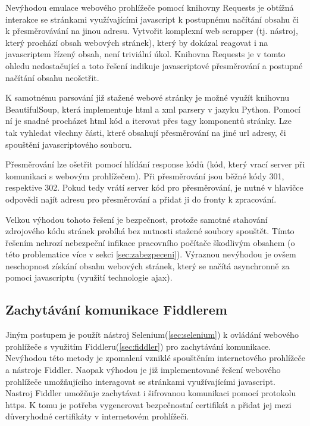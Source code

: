 \documentclass[thesis=M,czech,hidelinks]{FITthesis}[2013/05/06]
\begin{document}
Nevýhodou emulace webového prohlížeče pomocí knihovny Requests je obtížná interakce se stránkami využívajícími javascript k postupnému načítání obsahu či k přesměrovávání na jinou adresu. Vytvořit komplexní web scrapper (tj. nástroj, který prochází obsah webových stránek), který by dokázal reagovat i na javascriptem řízený obsah, není triviální úkol.  Knihovna Requests je v tomto ohledu nedostačující a toto řešení indikuje javascriptové přesměrování a postupné načítání obsahu neošetřit.

K samotnému parsování již stažené webové stránky je možné využít knihovnu BeautifulSoup\cite{beautifulsoup}, která implementuje html a xml parsery v jazyku Python. Pomocí ní je snadné procházet html kód a iterovat přes tagy komponentů stránky. Lze tak vyhledat všechny části, které obsahují přesměrování na jiné url adresy, či spouštění javascriptového souboru. 

Přesměrování lze ošetřit pomocí hlídání response kódů (kód, který vrací server při komunikaci s webovým prohlížečem). Při přesměrování jsou běžné kódy 301, respektive 302. Pokud tedy vrátí server kód pro přesměrování, je nutné v hlavičce odpovědi najít adresu pro přesměrování a přidat ji do fronty k zpracování.

Velkou výhodou tohoto řešení je bezpečnost, protože samotné stahování zdrojového kódu stránek probíhá bez nutnosti stažené soubory spouštět. Tímto řešením nehrozí nebezpeční infikace pracovního počítače škodlivým obsahem (o této problematice více v sekci \ref{sec:zabezpeceni}). Výraznou nevýhodou je ovšem neschopnost získání obsahu webových stránek, který se načítá asynchronně za pomoci javascriptu (využití technologie ajax).

\subsection{Zachytávání komunikace Fiddlerem}
Jiným postupem je použít nástroj Selenium(\ref{sec:selenium}) k ovládání webového prohlížeče s využitím Fiddleru(\ref{sec:fiddler}) pro zachytávání komunikace. Nevýhodou této metody je zpomalení vzniklé spouštěním internetového prohlížeče a nástroje Fiddler. Naopak výhodou je již implementované řešení webového prohlížeče umožňujícího interagovat se stránkami využívajícími javascript. Nastroj Fiddler umožňuje zachytávat i šifrovanou komunikaci pomocí protokolu https. K tomu je potřeba vygenerovat bezpečnostní certifikát a přidat jej mezi důveryhodné certifikáty v internetovém prohlížeči.
\end{document}
